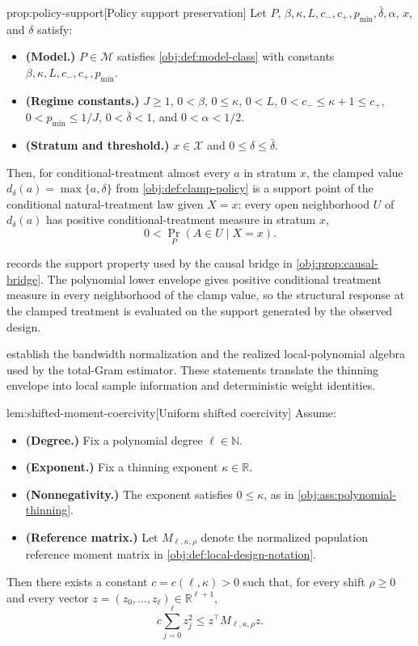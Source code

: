 \begin{propositionv}{prop:policy-support}[Policy support preservation]
Let \(P\), \(\beta,\kappa,L,c_-,c_+,p_{\min},\bar\delta,\alpha\), \(x\), and \(\delta\) satisfy:
\begin{itemize}
\item \textbf{(Model.)} \(P\in\mathcal M\) satisfies \cref{obj:def:model-class} with constants \(\beta,\kappa,L,c_-,c_+,p_{\min}\).
\item \textbf{(Regime constants.)} \(J\ge 1\), \(0<\beta\), \(0\le \kappa\), \(0<L\), \(0<c_-\le \kappa+1\le c_+\), \(0<p_{\min}\le 1/J\), \(0<\bar\delta<1\), and \(0<\alpha<1/2\).
\item \textbf{(Stratum and threshold.)} \(x\in\mathcal X\) and \(0\le \delta\le \bar\delta\).
\end{itemize}
Then, for conditional-treatment almost every \(a\) in stratum \(x\), the clamped value \(d_\delta(a)=\max\{a,\delta\}\) from \cref{obj:def:clamp-policy} is a support point of the conditional natural-treatment law given \(X=x\): every open neighborhood \(U\) of \(d_\delta(a)\) has positive conditional-treatment measure in stratum \(x\),
\[
0<\Pr_P(A\in U\mid X=x).
\]
\end{propositionv}

 records the support property used by the causal bridge in \cref{obj:prop:causal-bridge}. The polynomial lower envelope gives positive conditional treatment measure in every neighborhood of the clamp value, so the structural response at the clamped treatment is evaluated on the support generated by the observed design.

 establish the bandwidth normalization and the realized local-polynomial algebra used by the total-Gram estimator. These statements translate the thinning envelope into local sample information and deterministic weight identities.

\begin{lemmav}{lem:shifted-moment-coercivity}[Uniform shifted coercivity]
Assume:
\begin{itemize}
\item \textbf{(Degree.)} Fix a polynomial degree \(\ell\in\mathbb N\).
\item \textbf{(Exponent.)} Fix a thinning exponent \(\kappa\in\mathbb R\).
\item \textbf{(Nonnegativity.)} The exponent satisfies \(0\le \kappa\), as in \cref{obj:ass:polynomial-thinning}.
\item \textbf{(Reference matrix.)} Let \(M_{\ell,\kappa,\rho}\) denote the normalized population reference moment matrix in \cref{obj:def:local-design-notation}.
\end{itemize}
Then there exists a constant \(c=c(\ell,\kappa)>0\) such that, for every shift \(\rho\ge 0\) and every vector \(z=(z_0,\ldots,z_\ell)\in\mathbb R^{\ell+1}\),
\[
c\sum_{j=0}^{\ell} z_j^2
\le
z^\top M_{\ell,\kappa,\rho}z .
\]
\end{lemmav}

